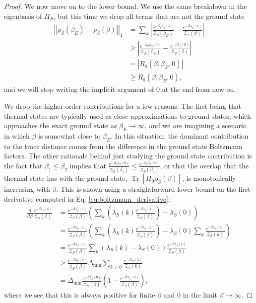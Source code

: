 \documentclass{article}
\newcommand{\parens}[1]{\left( #1 \right)}
\newcommand{\brackets}[1]{\left[ #1 \right]}
\newcommand{\abs}[1]{\left| #1 \right|}
\newcommand{\norm}[1]{\left| \left| #1 \right| \right|}
\DeclareMathOperator{\Tr}{Tr}
\newcommand{\trace}[1]{\Tr \brackets{ #1 }}
\newcommand{\partfun}{\mathcal{Z}}
\begin{document}
\begin{proof}
    We now move on to the lower bound. We use the same breakdown in the eigenbasis of $H_S$, but this time we drop all terms that are not the ground state 
    \begin{align}
        \norm{\rho_S(\beta_E) - \rho_S(\beta)}_1 &= \sum_k \abs{\frac{e^{-\beta_E \lambda_S(k)}}{\partfun_S(\beta_E)} - \frac{e^{-\beta \lambda_S(k)}}{\partfun_S(\beta)}} \\
        &\geq \abs{\frac{e^{-\beta_E \lambda_S(0)}}{\partfun_S(\beta_E)} - \frac{e^{-\beta \lambda_S(0)}}{\partfun_S(\beta)}} \\
        &= \abs{R_0(\beta, \beta_E, 0)} \\
        &\geq R_0(\beta, \beta_E, 0),
    \end{align}
    and we will stop writing the implicit argument of 0 at the end from now on. 
    
    We drop the higher order contributions for a few reasons. The first being that thermal states are typically used as close approximations to ground states, which approaches the exact ground state as $\beta_E \to \infty$, and we are imagining a scenario in which $\beta$ is somewhat close to $\beta_E$. In this situation, the dominant contribution to the trace distance comes from the difference in the ground state Boltzmann factors. The other rationale behind just studying the ground state contribution is the fact that $\beta_1 \leq \beta_2$ implies that $\frac{e^{-\beta_1 \lambda_S(0)}}{\partfun_S(\beta_1)} \leq \frac{e^{-\beta_2 \lambda_S(0)}}{\partfun_S(\beta_2)}$, or that the overlap that the thermal state has with the ground state, $\trace{\Pi_0 \rho_S(\beta)}$, is monotonically increasing with $\beta$. This is shown using a straightforward lower bound on the first derivative computed in Eq. \eqref{eq:boltzmann_derivative}:
    \begin{align}
        \frac{d}{d\beta} \frac{e^{-\beta \lambda_S(0)}}{\partfun_S(\beta)} &= \frac{e^{-\beta \lambda_S(0)}}{\partfun_S(\beta)} \parens{ \sum_k \left(\lambda_S(k) \frac{e^{-\beta \lambda_S(k)}}{\partfun_S(\beta)} \right) - \lambda_S(0) } \\
        &= \frac{e^{-\beta \lambda_S(0)}}{\partfun_S(\beta)} \parens{ \sum_k \left(\lambda_S(k) \frac{e^{-\beta \lambda_S(k)}}{\partfun_S(\beta)} \right) - \lambda_S(0) \sum_k \frac{e^{-\beta \lambda_S(k)}}{\partfun_S(k)} } \\
        &= \frac{e^{-\beta \lambda_S(0)}}{\partfun_S(\beta)} \sum_k (\lambda_S(k) - \lambda_S(0)) \frac{e^{-\beta \lambda_S(k)}}{\partfun_S(\beta)}  \\
        &\geq \frac{e^{-\beta \lambda_S(0)}}{\partfun_S(\beta)} \Delta_{\min} \sum_{k > 0} \frac{e^{-\beta \lambda_S(k)}}{\partfun_S(k)} \\
        &= \Delta_{\min} \frac{e^{-\beta \lambda_S(0)}}{\partfun_S(\beta)} \parens{1 - \frac{e^{-\beta \lambda_S(0)}}{\partfun_S(\beta)}}, \label{eq:boltzmann_derivative_lower_bound}
    \end{align}
    where we see that this is always positive for finite $\beta$ and 0 in the limit $\beta \to \infty$.  
    

\end{proof}
\end{document}
